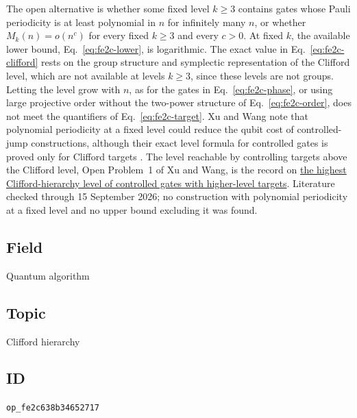 The open alternative is whether some fixed level $k\geq3$ contains gates
whose Pauli periodicity is at least polynomial in $n$ for infinitely many $n$,
or whether $M_k(n)=o(n^c)$ for every fixed $k\geq3$ and every $c>0$.  At fixed
$k$, the available lower bound, Eq.~\eqref{eq:fe2c-lower}, is logarithmic.  The
exact value in Eq.~\eqref{eq:fe2c-clifford} rests on the group structure and
symplectic representation of the Clifford level, which are not available at
levels $k\geq3$, since these levels are not groups.  Letting the level grow with
$n$, as for the gates in Eq.~\eqref{eq:fe2c-phase}, or using large projective
order without the two-power structure of Eq.~\eqref{eq:fe2c-order}, does not
meet the quantifiers of Eq.~\eqref{eq:fe2c-target}.  Xu and Wang note that
polynomial periodicity at a fixed level could reduce the qubit cost of
controlled-jump constructions, although their exact level formula for
controlled gates is proved only for Clifford targets
.  The level reachable by controlling targets above the Clifford
level, Open Problem~1 of Xu and Wang, is the record on
\href{https://qiqc-op.com/problem/op_e432fc5ff73e63be/}{the highest Clifford-hierarchy level of controlled gates with
higher-level targets}.  Literature checked through 15 September
2026; no construction with polynomial periodicity at a fixed level and no upper
bound excluding it was found.

\subsection*{Field}

Quantum algorithm

\subsection*{Topic}

Clifford hierarchy

\subsection*{ID}

\texttt{op\_fe2c638b34652717}
